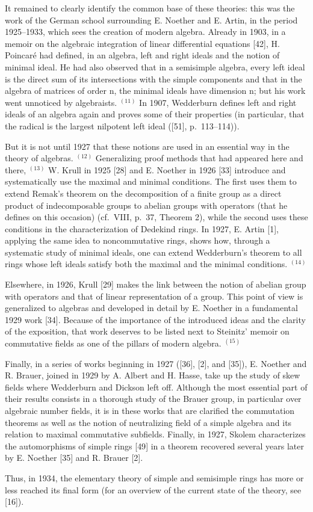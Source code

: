 It remained to clearly identify the common base of these theories: this was the work of the German school surrounding E. Noether and E. Artin, in the period 1925--1933, which sees the creation of modern algebra. Already in 1903, in a memoir on the algebraic integration of linear differential equations {[}42{]}, H. Poincaré had defined, in an algebra, left and right ideals and the notion of minimal ideal. He had also observed that in a semisimple algebra, every left ideal is the direct sum of its intersections with the simple components and that in the algebra of matrices of order n, the minimal ideals have dimension n; but his work went unnoticed by algebraists. \(^{(11)}\) In 1907, Wedderburn defines left and right ideals of an algebra again and proves some of their properties (in particular, that the radical is the largest nilpotent left ideal ({[}51{]}, p.~113--114)).

But it is not until 1927 that these notions are used in an essential way in the theory of algebras. \(^{(12)}\) Generalizing proof methods that had appeared here and there, \(^{(13)}\) W. Krull in 1925 {[}28{]} and E. Noether in 1926 {[}33{]} introduce and systematically use the maximal and minimal conditions. The first uses them to extend Remak's theorem on the decomposition of a finite group as a direct product of indecomposable groups to abelian groups with operators (that he defines on this occasion) (cf.~VIII, p.~37, Theorem 2), while the second uses these conditions in the characterization of Dedekind rings. In 1927, E. Artin {[}1{]}, applying the same idea to noncommutative rings, shows how, through a systematic study of minimal ideals, one can extend Wedderburn's theorem to all rings whose left ideals satisfy both the maximal and the minimal conditions. \(^{(14)}\)

Elsewhere, in 1926, Krull {[}29{]} makes the link between the notion of abelian group with operators and that of linear representation of a group. This point of view is generalized to algebras and developed in detail by E. Noether in a fundamental 1929 work {[}34{]}. Because of the importance of the introduced ideas and the clarity of the exposition, that work deserves to be listed next to Steinitz' memoir on commutative fields as one of the pillars of modern algebra. \(^{(15)}\)

Finally, in a series of works beginning in 1927 ({[}36{]}, {[}2{]}, and {[}35{]}), E. Noether and R. Brauer, joined in 1929 by A. Albert and H. Hasse, take up the study of skew fields where Wedderburn and Dickson left off. Although the most essential part of their results consists in a thorough study of the Brauer group, in particular over algebraic number fields, it is in these works that are clarified the commutation theorems as well as the notion of neutralizing field of a simple algebra and its relation to maximal commutative subfields. Finally, in 1927, Skolem characterizes the automorphisms of simple rings {[}49{]} in a theorem recovered several years later by E. Noether {[}35{]} and R. Brauer {[}2{]}.

Thus, in 1934, the elementary theory of simple and semisimple rings has more or less reached its final form (for an overview of the current state of the theory, see {[}16{]}).
\relax{}
